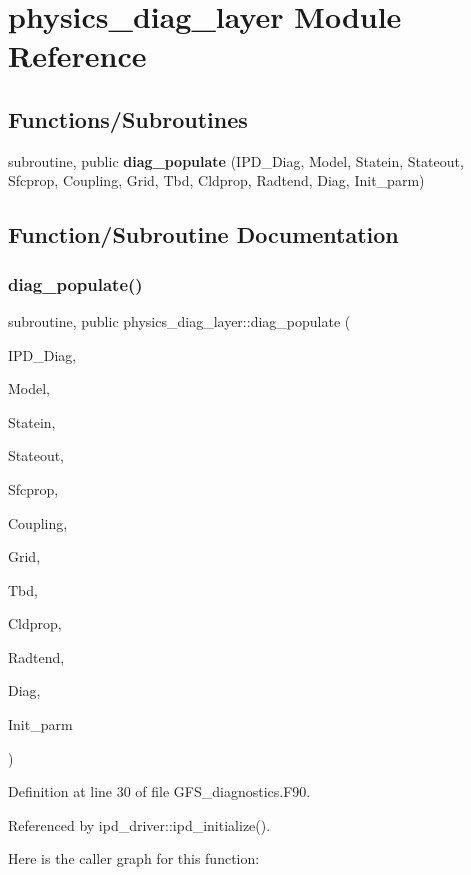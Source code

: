 \section{physics\+\_\+diag\+\_\+layer Module Reference}
\label{namespacephysics__diag__layer}
\subsection*{Functions/\+Subroutines}
\begin{DoxyCompactItemize}
\item 
subroutine, public \textbf{ diag\+\_\+populate} (I\+P\+D\+\_\+\+Diag, Model, Statein, Stateout, Sfcprop, Coupling, Grid, Tbd, Cldprop, Radtend, Diag, Init\+\_\+parm)
\end{DoxyCompactItemize}


\subsection{Function/\+Subroutine Documentation}
\mbox{\label{namespacephysics__diag__layer_a4d8ef1b40970ac1db897bac73e439e59}} 
\subsubsection{diag\+\_\+populate()}
{\footnotesize\ttfamily subroutine, public physics\+\_\+diag\+\_\+layer\+::diag\+\_\+populate (\begin{DoxyParamCaption}\item[{type(ipd\+\_\+diag\+\_\+type), dimension(\+:), intent(inout)}]{I\+P\+D\+\_\+\+Diag,  }\item[{type(control\+\_\+type), intent(in)}]{Model,  }\item[{type(statein\+\_\+type), dimension(\+:), intent(in)}]{Statein,  }\item[{type(stateout\+\_\+type), dimension(\+:), intent(in)}]{Stateout,  }\item[{type(sfcprop\+\_\+type), dimension(\+:), intent(in)}]{Sfcprop,  }\item[{type(coupling\+\_\+type), dimension(\+:), intent(in)}]{Coupling,  }\item[{type(grid\+\_\+type), dimension(\+:), intent(in)}]{Grid,  }\item[{type(tbd\+\_\+type), dimension(\+:), intent(in)}]{Tbd,  }\item[{type(cldprop\+\_\+type), dimension(\+:), intent(in)}]{Cldprop,  }\item[{type(radtend\+\_\+type), dimension(\+:), intent(in)}]{Radtend,  }\item[{type(intdiag\+\_\+type), dimension(\+:), intent(in)}]{Diag,  }\item[{type(init\+\_\+type), intent(in)}]{Init\+\_\+parm }\end{DoxyParamCaption})}



Definition at line 30 of file G\+F\+S\+\_\+diagnostics.\+F90.



Referenced by ipd\+\_\+driver\+::ipd\+\_\+initialize().

Here is the caller graph for this function\+:
